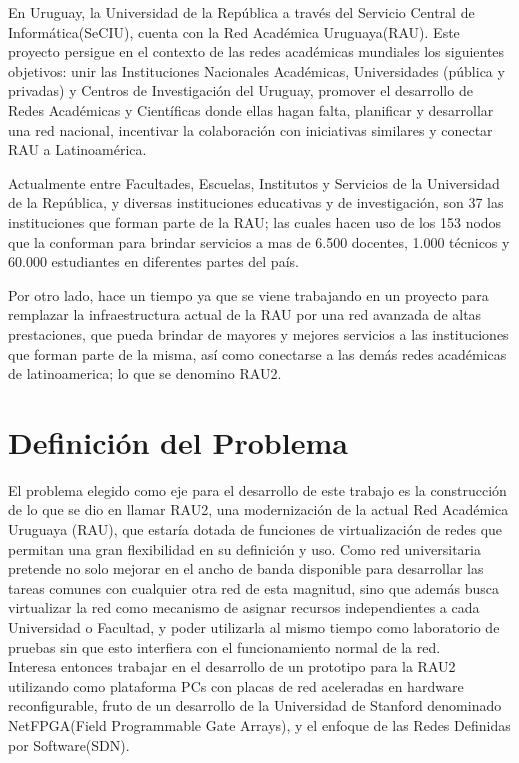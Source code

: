 En Uruguay, la Universidad de la República a través del Servicio Central de Informática(SeCIU), cuenta con la Red Académica Uruguaya(RAU). Este proyecto persigue en el contexto de las redes académicas mundiales los siguientes objetivos: unir las Instituciones Nacionales Académicas, Universidades (pública y privadas) y Centros de Investigación del Uruguay, promover el desarrollo de Redes Académicas y Científicas donde ellas hagan falta, planificar y desarrollar una red nacional, incentivar la colaboración con iniciativas similares y conectar RAU a Latinoamérica. 

Actualmente entre Facultades, Escuelas, Institutos y Servicios de la Universidad de la República, y diversas instituciones educativas y de investigación, son 37 las instituciones que forman parte de la RAU; las cuales hacen uso de los 153 nodos que la conforman para brindar servicios a mas de 6.500 docentes, 1.000 técnicos y 60.000 estudiantes en diferentes partes del país.

Por otro lado, hace un tiempo ya que se viene trabajando en un proyecto para remplazar la infraestructura actual de la RAU por una red avanzada de altas prestaciones, que pueda brindar de mayores y mejores servicios a las instituciones que forman parte de la misma, así como conectarse a las demás redes académicas de latinoamerica; lo que se denomino RAU2.  

\section{Definición del Problema}

El problema elegido como eje para el desarrollo de este trabajo es la 
construcción de lo que se dio en llamar RAU2, una modernización de la actual Red Académica Uruguaya (RAU), que estaría dotada de funciones de virtualización de redes que permitan una gran flexibilidad en su definición y uso. Como red universitaria pretende no solo mejorar en el ancho de banda disponible para desarrollar las tareas comunes con cualquier otra red de esta magnitud, sino que además busca virtualizar la red como mecanismo de asignar recursos independientes a cada Universidad o Facultad, y poder utilizarla al mismo tiempo como laboratorio de pruebas sin que esto interfiera con el funcionamiento normal de la red.\\

Interesa entonces trabajar en el desarrollo de un prototipo para la RAU2 utilizando como plataforma PCs con placas de red aceleradas en hardware reconfigurable, fruto de un desarrollo de la Universidad de Stanford denominado NetFPGA(Field Programmable Gate Arrays)\citep{NetFPGA}, y el enfoque de las Redes Definidas por Software(SDN)\citep{gude2008nox}\citep{SDNReadingList}.

